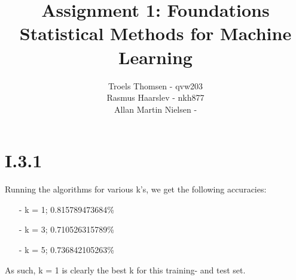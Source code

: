 \documentclass[12pt, a4paper]{article}
\title{Assignment 1: Foundations\\Statistical Methods for Machine Learning}
\author{Troels Thomsen - qvw203\\Rasmus Haarslev - nkh877\\Allan Martin Nielsen - }
\begin{document}
\pagestyle{empty}
\maketitle
\newpage

\pagestyle{fancy}

\section{I.3.1}
Running the algorithms for various k's, we get the following accuracies:

\begin{itemize}
\item[-] k = 1; 0.815789473684\%
\item[-] k = 3; 0.710526315789\% 
\item[-] k = 5; 0.736842105263\%
\end{itemize}

As such, k = 1 is clearly the best k for this training- and test set.
\end{document}
